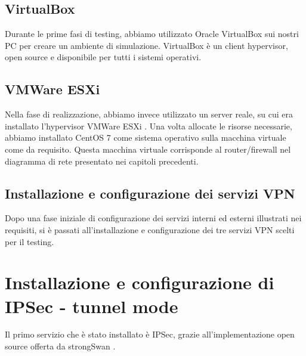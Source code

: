 \subsection{VirtualBox}
Durante le prime fasi di testing, abbiamo utilizzato Oracle VirtualBox \cite{virtualbox} sui nostri PC per creare un ambiente di simulazione. VirtualBox è un client hypervisor, open source e disponibile per tutti i sistemi operativi.
\subsection{VMWare ESXi}
Nella fase di realizzazione, abbiamo invece utilizzato un server reale, su cui era installato l'hypervisor VMWare ESXi \cite{esxi}. Una volta allocate le risorse necessarie, abbiamo installato CentOS 7 come sistema operativo sulla macchina virtuale come da requisito.
Questa macchina virtuale corrisponde al router/firewall nel diagramma di rete presentato nei capitoli precedenti.

\subsection{Installazione e configurazione dei servizi VPN}
Dopo una fase iniziale di configurazione dei servizi interni ed esterni illustrati nei requisiti, si è passati all'installazione e configurazione dei tre servizi VPN scelti per il testing.

\section{Installazione e configurazione di IPSec - tunnel mode}
Il primo servizio che è stato installato è IPSec, grazie all'implementazione open source offerta da strongSwan \cite{strongSwan}.


